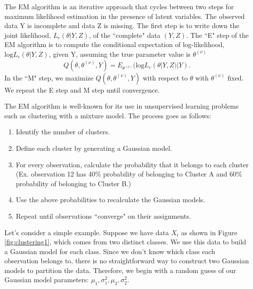 \documentclass[11pt]{article}
\begin{document}
The EM algorithm is an iterative approach that cycles between two steps for maximum likelihood estimation in the presence of latent variables. The observed data Y is incomplete and data Z is missing. The first step is to write down the joint likelihood, $L_c(
\theta|Y,Z)$, of the ``complete" data $(Y,Z)$. The ``E" step of the EM algorithm is to compute the conditional expectation of log-likelihood, $\text{log}L_c(
\theta|Y,Z)$, given Y, assuming the true parameter value is $\theta^{(\nu)}$
\[Q(\theta,\theta^{(\nu)},Y)=E_{\theta^{(\nu)}}(\text{log}L_c(
\theta|Y,Z)|Y).\] In the ``M" step, we maximize $Q(\theta,\theta^{(\nu)},Y)$ with respect to $\theta$ with $\theta^{(\nu)}$ fixed. We repeat the E step and M step until convergence.  

The EM algorithm is well-known for its use in unsupervised learning problems such as clustering with a mixture model. The process goes as follows:
\begin{enumerate}
    \item Identify the number of clusters. 
    \item Define each cluster by generating a Gaussian model. 
    \item For every observation, calculate the probability that it belongs to each cluster (Ex. observation 12 has 40\% probability of belonging to Cluster A and 60\% probability of belonging to Cluster B.)
    \item Use the above probabilities to recalculate the Gaussian models. 
    \item Repeat until observations ``converge" on their assignments. 
\end{enumerate}

Let's consider a simple example. Suppose we have data $X_i$ as shown in Figure \ref{fig:clustering1}, which comes from two distinct classes. We use this data to build a Gaussian model for each class. Since we don't know which class each observation belongs to, there is no straightforward way to construct two Gaussian models to partition the data. Therefore, we begin with a random guess of our Gaussian model parameters: $\mu_1,\sigma^2_1, \mu_2,\sigma^2_2$. 
\end{document}
